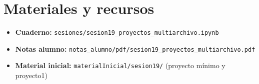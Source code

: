 \documentclass[12pt, oneside]{article}
\begin{document}
\section{Materiales y recursos}

\begin{itemize}
  \item \textbf{Cuaderno:}
        \texttt{sesiones/sesion19\_proyectos\_multiarchivo.ipynb}
  \item \textbf{Notas alumno:}
        \texttt{notas\_alumno/pdf/sesion19\_proyectos\_multiarchivo.pdf}
  \item \textbf{Material inicial:}
        \texttt{materialInicial/sesion19/} (proyecto mínimo y proyecto1)
\end{itemize}
\end{document}
